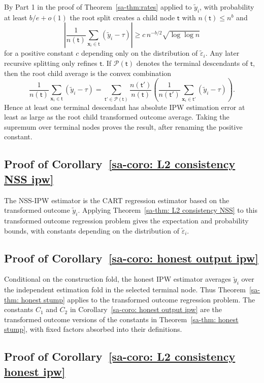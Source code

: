 \documentclass[10pt]{article}
\def\nodet{\mathsf{t}}
\def\bx{\mathbf{x}}
\theoremstyle{definition}
\theoremstyle{remark}
\begin{document}
By Part 1 in the proof of Theorem~\ref{sa-thm:rates} applied to $\tilde y_i$, with probability at least $b/e+o(1)$ the root split creates a child node $\nodet$ with $n(\nodet)\leq n^b$ and
\[
    \left|
    \frac{1}{n(\nodet)}\sum_{\bx_i\in\nodet}(\tilde y_i-\tau)
    \right|
    \geq
    c\,n^{-b/2}\sqrt{\log\log n}
\]
for a positive constant $c$ depending only on the distribution of $\tilde\varepsilon_i$. Any later recursive splitting only refines $\nodet$. If $\mathcal P(\nodet)$ denotes the terminal descendants of $\nodet$, then the root child average is the convex combination
\[
    \frac{1}{n(\nodet)}\sum_{\bx_i\in\nodet}(\tilde y_i-\tau)
    =
    \sum_{\nodet'\in\mathcal P(\nodet)}
    \frac{n(\nodet')}{n(\nodet)}
    \left(
    \frac{1}{n(\nodet')}\sum_{\bx_i\in\nodet'}(\tilde y_i-\tau)
    \right).
\]
Hence at least one terminal descendant has absolute IPW estimation error at least as large as the root child transformed outcome average. Taking the supremum over terminal nodes proves the result, after renaming the positive constant.

\subsection{Proof of Corollary~\ref{sa-coro: L2 consistency NSS ipw}}

The NSS-IPW estimator is the CART regression estimator based on the transformed outcome $\tilde y_i$. Applying Theorem~\ref{sa-thm: L2 consistency NSS} to this transformed outcome regression problem gives the expectation and probability bounds, with constants depending on the distribution of $\tilde\varepsilon_i$.

\subsection{Proof of Corollary~\ref{sa-coro: honest output ipw}}

Conditional on the construction fold, the honest IPW estimator averages $\tilde y_i$ over the independent estimation fold in the selected terminal node. Thus Theorem~\ref{sa-thm: honest stump} applies to the transformed outcome regression problem. The constants $C_1$ and $C_2$ in Corollary~\ref{sa-coro: honest output ipw} are the transformed outcome versions of the constants in Theorem~\ref{sa-thm: honest stump}, with fixed factors absorbed into their definitions.

\subsection{Proof of Corollary~\ref{sa-coro: L2 consistency honest ipw}}
\end{document}
